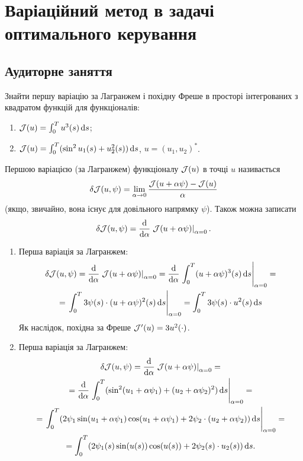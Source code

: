 \section{Варіаційний метод в задачі оптимального керування}

\subsection{Аудиторне заняття}

\begin{problem}
	Знайти першу варіацію за Лагранжем і похідну Фреше в просторі інтегрованих з квадратом функцій для функціоналів:
	\begin{enumerate}
		\item $\mathcal{J} (u) = \int_0^T u^3(s) \mathop{}\!\mathrm{d} s$;

		\item $\mathcal{J} (u) = \int_0^T (\sin^2 u_1(s) + u_2^2(s)) \mathop{}\!\mathrm{d} s$, $u = (u_1, u_2)^*$.
	\end{enumerate}
\end{problem}

\begin{solution}
	Першою варіацією (за Лагранжем) функціоналу $\mathcal{J}(u)$ в точці $u$ називається \[\delta \mathcal{J}(u, \psi) = \lim\limits_{\alpha \to 0} \frac{\mathcal{J}(u + \alpha \psi) - \mathcal{J}(u)}{\alpha}\] (якщо, звичайно, вона існує для довільного напрямку $\psi$). Також можна записати \[ \delta \mathcal{J}(u, \psi) = \frac{\mathop{}\!\mathrm{d}}{\mathop{}\!\mathrm{d} \alpha} \left.\mathcal{J}(u + \alpha \psi)\right|_{\alpha = 0}. \]

	\begin{enumerate}
		\item Перша варіація за Лагранжем:
		\begin{multline*} 
			\delta \mathcal{J}(u, \psi) = \frac{\mathop{}\!\mathrm{d}}{\mathop{}\!\mathrm{d} \alpha} \left.\mathcal{J}(u + \alpha \psi)\right|_{\alpha = 0} = \frac{\mathop{}\!\mathrm{d}}{\mathop{}\!\mathrm{d} \alpha} \left.\int_0^T(u + \alpha \psi)^3(s) \mathop{}\!\mathrm{d} s\right|_{\alpha = 0} = \\
			= \left.\int_0^T 3 \psi(s) \cdot (u + \alpha \psi)^2(s) \mathop{}\!\mathrm{d} s\right|_{\alpha = 0} = \int_0^T 3 \psi(s) \cdot u^2(s) \mathop{}\!\mathrm{d} s
		\end{multline*} 
		Як наслідок, похідна за Фреше $\mathcal{J}'(u) = 3 u^2(\cdot)$.

		\item Перша варіація за Лагранжем:
		\begin{multline*} 
			\delta \mathcal{J}(u, \psi) = \frac{\mathop{}\!\mathrm{d}}{\mathop{}\!\mathrm{d} \alpha} \left.\mathcal{J}(u + \alpha \psi)\right|_{\alpha = 0} = \\
			= \frac{\mathop{}\!\mathrm{d}}{\mathop{}\!\mathrm{d} \alpha} \left. \int_0^T (\sin^2 (u_1 + \alpha\psi_1) + (u_2 + \alpha \psi_2)^2) \mathop{}\!\mathrm{d} s\right|_{\alpha = 0} = \\
			= \left. \int_0^T (2 \psi_1 \sin(u_1 + \alpha \psi_1)\cos(u_1 + \alpha \psi_1) + 2\psi_2 \cdot (u_2 + \alpha \psi_2)) \mathop{}\!\mathrm{d} s\right|_{\alpha = 0} = \\
			= \int_0^T (2 \psi_1(s) \sin(u(s)) \cos(u(s)) + 2 \psi_2(s) \cdot u_2(s)) \mathop{}\!\mathrm{d} s.
		\end{multline*}
	\end{enumerate} 
\end{solution}

